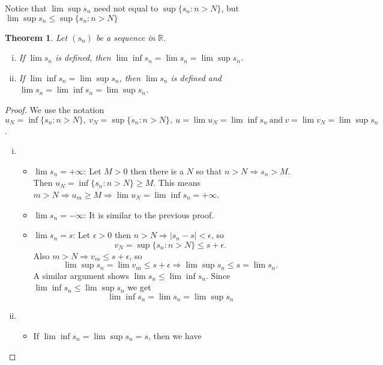 \documentclass[12pt, lettersize]{book}
\newtheorem{thm}{Theorem}[section]
\begin{document}
		Notice that $\lim\sup s_n$ need not equal to $\sup\{s_n: n>N\}$, but $\lim\sup s_n\leq\sup\{s_n: n>N\}$
		
		
		\begin{thm}\label{def:condition for limit}
		Let $(s_n)$ be a sequence in $\mathbb{R}$.
		\begin{enumerate}[(i)]
			\item If $\lim s_n$ is defined, then $\lim\inf s_n=\lim s_n=\lim\sup s_n$.
			\item If $\lim\inf s_n=\lim\sup s_n$, then $\lim s_n$ is defined and $\lim s_n=\lim\inf s_n=\lim\sup s_n$.
		\end{enumerate}
		\end{thm}
		\begin{proof}
		We use the notation $u_N=\inf\{s_n: n>N\},\ v_N=\sup \{s_n: n>N\},\ u=\lim u_N=\lim\inf s_n\ \text{and}\ v=\lim v_N=\lim\sup s_n$.
		\begin{enumerate}[(i)]
			\item \begin{itemize}
					  \item $\lim s_n=+\infty$: Let $M>0$ then there is a $N$ so that $n>N\Rightarrow s_n>M$. Then
					  $u_N=\inf\{s_n: n>N\}\geq M$. This means $m>N\Rightarrow u_m\geq M\Rightarrow\lim u_N=\lim\inf s_n=+\infty$.
					  \item $\lim s_n=-\infty$: It is similar to the previous proof.
					  \item $\lim s_n=s$: Let $\epsilon>0$ then $n>N\Rightarrow |s_n-s|<\epsilon$, so
					  \begin{displaymath}
					  	v_N=\sup\{s_n: n>N\}\leq s+\epsilon.
					  \end{displaymath}
				  	  Also $m>N\Rightarrow v_m\leq s+\epsilon$, so 
				  	  \begin{displaymath}
				  	  	\lim\sup s_n=\lim v_m\leq s+\epsilon\Rightarrow\lim\sup s_n\leq s=\lim s_n.
				  	  \end{displaymath}
			  	  	  A similar argument shows $\lim s_n\leq\lim\inf s_n$. Since $\lim\inf s_n\leq\lim\sup s_n$ we get
			  	  	  \begin{displaymath}
			  	  	  	\lim\inf s_n=\lim s_n=\lim\sup s_n
			  	  	  \end{displaymath}
				  \end{itemize}
			\item \begin{itemize}
					  \item If $\lim\inf s_n=\lim\sup s_n=s$, then we have
					  \begin{displaymath}

\end{displaymath}
\end{itemize}
\end{enumerate}
\end{proof}
\end{document}
